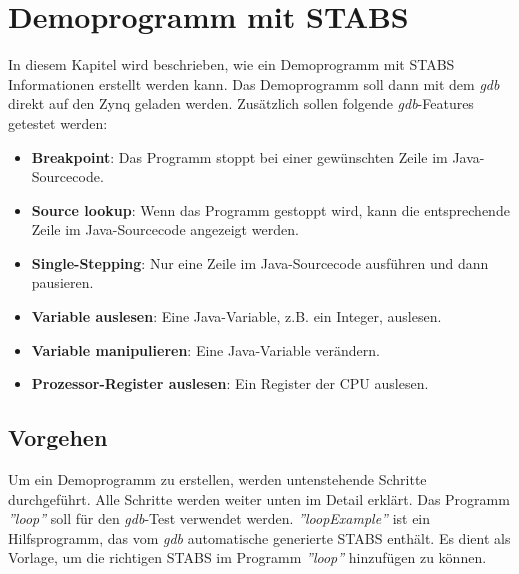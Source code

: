 \section{Demoprogramm mit STABS}
In diesem Kapitel wird beschrieben, wie ein Demoprogramm mit STABS Informationen erstellt werden kann.
Das Demoprogramm soll dann mit dem \textit{gdb} direkt auf den Zynq geladen werden.
Zusätzlich sollen folgende \textit{gdb}-Features getestet werden:\\
\begin{itemize}
	\item \textbf{Breakpoint}: Das Programm stoppt bei einer gewünschten Zeile im Java-Sourcecode.
	\item \textbf{Source lookup}: Wenn das Programm gestoppt wird, kann die entsprechende Zeile im Java-Sourcecode angezeigt werden.
	\item \textbf{Single-Stepping}: Nur eine Zeile im Java-Sourcecode ausführen und dann pausieren.
	\item \textbf{Variable auslesen}: Eine Java-Variable, z.B. ein Integer, auslesen.
	\item \textbf{Variable manipulieren}: Eine Java-Variable verändern.
	\item \textbf{Prozessor-Register auslesen}: Ein Register der CPU auslesen.
\end{itemize}

\subsection{Vorgehen}
Um ein Demoprogramm zu erstellen, werden untenstehende Schritte durchgeführt.
Alle Schritte werden weiter unten im Detail erklärt.
Das Programm \textit{''loop''} soll für den \textit{gdb}-Test verwendet werden.
\textit{''loopExample''} ist ein Hilfsprogramm, das vom \textit{gdb} automatische generierte STABS enthält.
Es dient als Vorlage, um die richtigen STABS im Programm \textit{''loop''} hinzufügen zu können.

